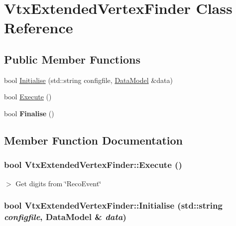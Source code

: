 \hypertarget{classVtxExtendedVertexFinder}{
\section{VtxExtendedVertexFinder Class Reference}
\label{classVtxExtendedVertexFinder}
}
\subsection*{Public Member Functions}
\begin{DoxyCompactItemize}
\item 
bool \hyperlink{classVtxExtendedVertexFinder_ac63dc8b1621acfdf80a1bc40101db02b}{Initialise} (std::string configfile, \hyperlink{classDataModel}{DataModel} \&data)
\item 
bool \hyperlink{classVtxExtendedVertexFinder_aa1d2b2a105f7a63498ab1d58ffed7acf}{Execute} ()
\item 
\hypertarget{classVtxExtendedVertexFinder_aac62092862d79d5dc0383636748a2b75}{
bool {\bfseries Finalise} ()}
\label{classVtxExtendedVertexFinder_aac62092862d79d5dc0383636748a2b75}

\end{DoxyCompactItemize}


\subsection{Member Function Documentation}
\hypertarget{classVtxExtendedVertexFinder_aa1d2b2a105f7a63498ab1d58ffed7acf}{
\subsubsection[{Execute}]{\setlength{\rightskip}{0pt plus 5cm}bool VtxExtendedVertexFinder::Execute ()}}
\label{classVtxExtendedVertexFinder_aa1d2b2a105f7a63498ab1d58ffed7acf}


$>$ Get digits from \char`\"{}RecoEvent\char`\"{} \hypertarget{classVtxExtendedVertexFinder_ac63dc8b1621acfdf80a1bc40101db02b}{
\subsubsection[{Initialise}]{\setlength{\rightskip}{0pt plus 5cm}bool VtxExtendedVertexFinder::Initialise (std::string {\em configfile}, \/  {\bf DataModel} \& {\em data})}}
\label{classVtxExtendedVertexFinder_ac63dc8b1621acfdf80a1bc40101db02b}


